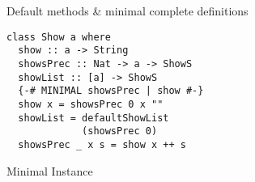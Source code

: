 \documentclass[aspectratio=169]{beamer}
\begin{document}
\begin{frame}[fragile]{Default methods \& minimal complete definitions}
\begin{minipage}{.65\textwidth}
\end{minipage}\vrule\hspace{.1cm}
\begin{minipage}{.35\textwidth}%
\begin{verbatim}
class Show a where
  show :: a -> String
  showsPrec :: Nat -> a -> ShowS
  showList :: [a] -> ShowS
  {-# MINIMAL showsPrec | show #-}
  show x = showsPrec 0 x ""
  showList = defaultShowList
             (showsPrec 0)
  showsPrec _ x s = show x ++ s
\end{verbatim}
\end{minipage}

\end{frame}

\begin{frame}[fragile]{Minimal Instance}


\end{frame}
\end{document}
